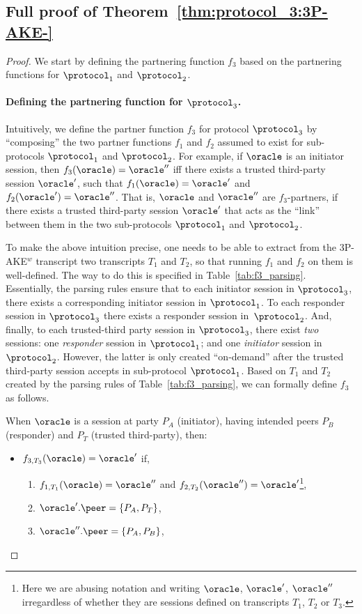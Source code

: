 \subsection{Full proof of Theorem~\ref{thm:protocol_3:3P-AKE-}}\label{sec:full_proof:pi3}




\begin{proof}
We start by defining the partnering function $f_3$ based on the partnering functions for $\protocol_1$ and $\protocol_2$.
\item
\paragraph{Defining the partnering function for $\protocol_3$.}
Intuitively,
we define the partner function $f_3$ for protocol $\protocol_3$ by ``composing'' the two partner functions $f_1$ and $f_2$ assumed to exist for sub-protocols $\protocol_1$ and $\protocol_2$.
For example,
if $\oracle$ is an initiator session,
then $f_{3}(\oracle) = \oracle''$ iff there exists a trusted third-party session $\oracle'$,
such that $f_1(\oracle) = \oracle'$ and  $f_2(\oracle') = \oracle''$.
That is, $\oracle$ and $\oracle''$ are $f_3$-partners,
if there exists a trusted third-party session $\oracle'$ that acts as the ``link'' between them in the two sub-protocols $\protocol_1$ and $\protocol_2$.

To make the above intuition precise, 
one needs to be able to extract from the 3P-AKE$^w$ transcript two transcripts $T_1$ and $T_2$,
so that running $f_1$ and $f_2$ on them is well-defined.
The way to do this is specified in Table~\ref{tab:f3_parsing}.
Essentially,
the parsing rules ensure that to each initiator session in $\protocol_3$,
there exists a corresponding initiator session in $\protocol_1$.
To each responder session in $\protocol_3$ there exists a responder session in~$\protocol_2$.
And,
finally,
to each trusted-third party session in $\protocol_3$, there exist \emph{two} sessions:
one \emph{responder} session in $\protocol_1$;
and one \emph{initiator} session in $\protocol_2$.
However, the latter is only created ``on-demand'' after the trusted third-party session accepts in sub-protocol $\protocol_1$.
Based on $T_1$ and $T_2$ created by the parsing rules of Table~\ref{tab:f3_parsing},
we can formally define $f_3$ as follows.

When $\oracle$ is a session at party $P_A$ (initiator),
having intended  peers $P_B$ (responder) and $P_T$ (trusted third-party),
then:
\begin{itemize}
	\item $f_{3,T_3}(\oracle) = \oracle'$ if,
	\begin{enumerate}
		\item $f_{1,T_1}(\oracle) = \oracle''$ and $f_{2,T_2}(\oracle'') = \oracle'$\footnote{Here 
		we are abusing notation and writing $\oracle$, $\oracle'$, $\oracle''$ irregardless of whether they are sessions defined on transcripts $T_1$, $T_2$ or $T_3$.},
		\item $\oracle'.\peer = \lbrace P_A, P_T \rbrace$,
		\item $\oracle''.\peer = \lbrace P_A, P_B \rbrace$,
	\end{enumerate}


\end{itemize}
\end{proof}
